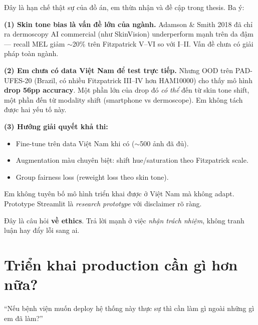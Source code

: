 \documentclass[11pt,a4paper]{article}
\begin{document}
\begin{answer}
Đây là hạn chế thật sự của đồ án, em thừa nhận và đề cập trong thesis. Ba ý:

\textbf{(1) Skin tone bias là vấn đề lớn của ngành.} Adamson \& Smith 2018 đã chỉ ra dermoscopy AI commercial (như SkinVision) underperform mạnh trên da đậm --- recall MEL giảm $\sim$20\% trên Fitzpatrick V--VI so với I--II. Vấn đề chưa có giải pháp toàn ngành.

\textbf{(2) Em chưa có data Việt Nam để test trực tiếp.} Nhưng OOD trên PAD-UFES-20 (Brazil, có nhiều Fitzpatrick III--IV hơn HAM10000) cho thấy mô hình \textbf{drop 56pp accuracy}. Một phần lớn của drop đó \textit{có thể} đến từ skin tone shift, một phần đến từ modality shift (smartphone vs dermoscope). Em không tách được hai yếu tố này.

\textbf{(3) Hướng giải quyết khả thi:}
\begin{itemize}[leftmargin=*]
  \item Fine-tune trên data Việt Nam khi có ($\sim$500 ảnh đã đủ).
  \item Augmentation màu chuyên biệt: shift hue/saturation theo Fitzpatrick scale.
  \item Group fairness loss (reweight loss theo skin tone).
\end{itemize}

Em không tuyên bố mô hình triển khai được ở Việt Nam mà không adapt. Prototype Streamlit là \textit{research prototype} với disclaimer rõ ràng.
\end{answer}

\begin{tip}
Đây là câu hỏi \textbf{về ethics}. Trả lời mạnh ở việc \textit{nhận trách nhiệm}, không tranh luận hay đẩy lỗi sang ai.
\end{tip}

\section{Triển khai production cần gì hơn nữa?}

\begin{question}
``Nếu bệnh viện muốn deploy hệ thống này thực sự thì cần làm gì ngoài những gì em đã làm?''
\end{question}
\end{document}
